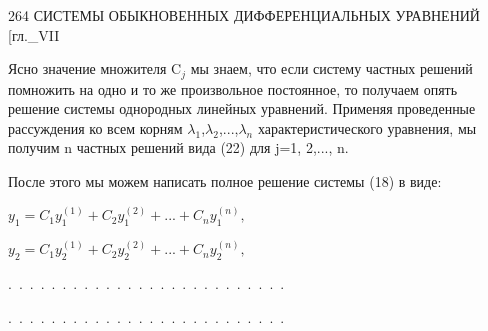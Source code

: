 \documentclass[11pt,a5paper,top=10mm]{book}
\begin{document}
	
	 \begin{scriptsize}
		264	
	  СИСТЕМЫ ОБЫКНОВЕННЫХ ДИФФЕРЕНЦИАЛЬНЫХ УРАВНЕНИЙ
	 [гл.\_VII
	 \end{scriptsize}
	 
	\par
	\medskip
	Ясно значение множителя C$_j$
	мы знаем, что если систему частных решений помножить на одно и то же произвольное постоянное, то получаем опять решение системы однородных линейных уравнений. Применяя проведенные рассуждения ко всем корням $\lambda_1$,$\lambda_2$,...,$\lambda_n$ характеристического уравнения, мы получим n частных решений вида (22) для j=1, 2,..., n.
	\par
	
	После этого мы можем написать полное решение системы (18) в виде:
	\par
	\hspace{20mm}
	$y_1=C_1y_1^{(1)}+C_2y_1^{(2)}+...+C_ny_1^{(n)},$
	\par
	\hspace{20mm}
	$y_2=C_1y_2^{(1)}+C_2y_2^{(2)}+...+C_ny_2^{(n)},$
	\par


		\hspace{20mm} .\ .\ .\ .\ .\ .\ .\ .\ .\ .\ .\ .\ .\ .\ .\ .\ .\ .\ .\ .\ .\ .\ .\ .\ .\ .\ 
		\par
	\hspace{20mm} .\ .\ .\ .\ .\ .\ .\ .\ .\ .\ .\ .\ .\ .\ .\ .\ .\ .\ .\ .\ .\ .\ .\ .\ .\ .\ 
	
\end{document}
